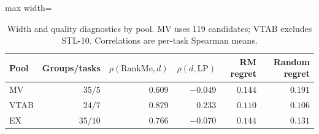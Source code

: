 \begin{table}[htbp]
\centering\small
\caption{Width and quality diagnostics by pool. MV uses 119 candidates; VTAB excludes STL-10. Correlations are per-task Spearman means.}
\label{tab:pool_diagnosis}
\setlength{\tabcolsep}{4pt}
\begin{adjustbox}{max width=\linewidth}
\begin{tabular}{lrrrrr}
\toprule
Pool & Groups/tasks & $\rho(\mathrm{RankMe},d)$ & $\rho(d,\mathrm{LP})$ & RM regret & Random regret \\
\midrule
MV & $35/5$ & $0.609$ & $-0.049$ & $0.144$ & $0.191$ \\
VTAB & $24/7$ & $0.879$ & $0.233$ & $0.110$ & $0.106$ \\
EX & $35/10$ & $0.766$ & $-0.070$ & $0.144$ & $0.131$ \\
\bottomrule
\end{tabular}
\end{adjustbox}
\end{table}
